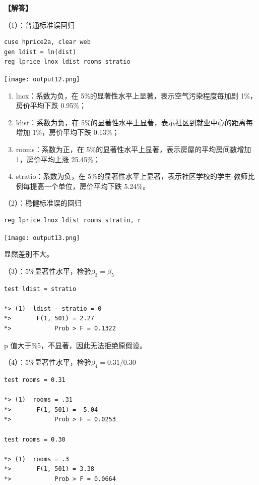 \documentclass[cn,fancy,blue,11pt]{elegantbook}
\begin{document}
\textbf{【解答】}

（1）：普通标准误回归

\begin{lstlisting}
cuse hprice2a, clear web
gen ldist = ln(dist)
reg lprice lnox ldist rooms stratio
\end{lstlisting}

\noindent\texttt{[image: output12.png]}

\begin{enumerate}
\item
  lnox：系数为负，在 5\%的显著性水平上显著，表示空气污染程度每加剧 1\%，房价平均下跌 0.95\%；
\item
  ldist：系数为负，在 5\%的显著性水平上显著，表示社区到就业中心的距离每增加 1\%，房价平均下跌 0.13\%；
\item
  rooms：系数为正，在 5\%的显著性水平上显著，表示房屋的平均房间数增加 1，房价平均上涨 25.45\%；
\item
  stratio：系数为负，在 5\%的显著性水平上显著，表示社区学校的学生-教师比例每提高一个单位，房价平均下跌 5.24\%。
\end{enumerate}

（2）：稳健标准误的回归

\begin{lstlisting}
reg lprice lnox ldist rooms stratio, r
\end{lstlisting}

\noindent\texttt{[image: output13.png]}

显然差别不大。

（3）：5\%显著性水平，检验\(\beta_3 = \beta_5\)

\begin{lstlisting}
test ldist = stratio

*> (1)  ldist - stratio = 0
*>       F(1, 501) = 2.27
*>            Prob > F = 0.1322
\end{lstlisting}

p 值大于\%5，不显著，因此无法拒绝原假设。

（4）：5\%显著性水平，检验\(\beta_4 = 0.31 / 0.30\)

\begin{lstlisting}
test rooms = 0.31

*> (1)  rooms = .31
*>       F(1, 501) =  5.04
*>            Prob > F = 0.0253

test rooms = 0.30

*> (1)  rooms = .3
*>       F(1, 501) = 3.38
*>            Prob > F = 0.0664
\end{lstlisting}
\end{document}
